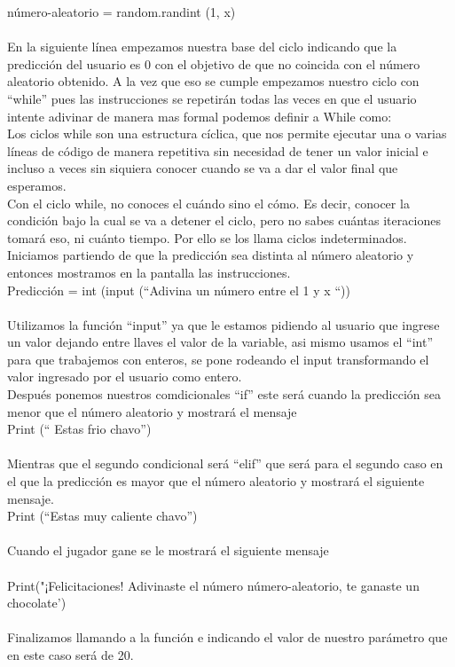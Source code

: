 \documentclass[12pt]{article}
\begin{document}
número-aleatorio = random.randint (1, x) \\
\\
En la siguiente línea empezamos nuestra base del ciclo indicando que la predicción del usuario es 0 con el objetivo de que no coincida con el número aleatorio obtenido. 
A la vez que eso se cumple empezamos nuestro ciclo con “while” pues las instrucciones se repetirán todas las veces en que el usuario intente adivinar de manera mas formal podemos definir a While como:\\
Los ciclos while son una estructura cíclica, que nos permite ejecutar una o varias líneas de código de manera repetitiva sin necesidad de tener un valor inicial e incluso a veces sin siquiera conocer cuando se va a dar el valor final que esperamos. 
\\ Con el ciclo while, no conoces el cuándo sino el cómo. Es decir, conocer la condición bajo la cual se va a detener el ciclo, pero no sabes cuántas iteraciones tomará eso, ni cuánto tiempo. Por ello se los llama ciclos indeterminados.
\\
Iniciamos partiendo de que la predicción sea distinta al número aleatorio y entonces mostramos en la pantalla las instrucciones. 
\\

Predicción = int (input (“Adivina un número entre el 1 y {x} “))
\\
\\Utilizamos la función “input” ya que le estamos pidiendo al usuario que ingrese un valor 
dejando entre llaves el valor de la variable, asi mismo usamos el “int” para que trabajemos con enteros, se pone rodeando el input transformando el valor ingresado por el usuario como entero. 
\\
Después ponemos nuestros comdicionales “if” este será cuando la predicción sea menor que el número aleatorio y mostrará el mensaje \\

Print (“ Estas frio chavo”) \\
\\
Mientras que el segundo condicional será “elif” que será para el segundo caso en el que la predicción es mayor que el número aleatorio y mostrará el siguiente mensaje. \\

Print (“Estas muy caliente chavo”)
\\
\\
Cuando el jugador gane se le mostrará el siguiente mensaje \\
\\
Print("¡Felicitaciones! Adivinaste el número {número-aleatorio}, te ganaste un chocolate')
\\ 
\\
Finalizamos llamando a la función e indicando el valor de nuestro parámetro que en este caso será de 20.
\end{document}
